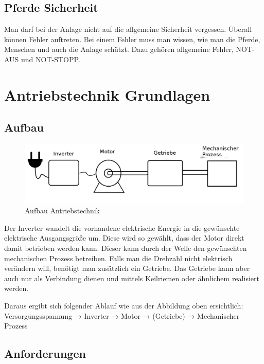 \documentclass[12pt]{scrreprt} %
\begin{document}
\subsection{Pferde Sicherheit}
\label{sec:pferdeSicherheit}

Man darf bei der Anlage nicht auf die allgemeine Sicherheit vergessen. Überall können Fehler auftreten. Bei einem Fehler muss man wissen, wie man die Pferde, Menschen und auch die Anlage schützt. Dazu gehören allgemeine Fehler, NOT-AUS und NOT-STOPP.
\newpage

\section{Antriebstechnik Grundlagen}
\label{sec:antriebstechnikGrundlagen}

\subsection{Aufbau}
\label{sec:aufbau}
\begin{figure}[!ht]
\begin{center}
	\caption{Aufbau Antriebstechnik}
	\includegraphics[width=1\textwidth]{AntriebstechnikAufbau}
\end{center}
\end{figure}

Der Inverter wandelt die vorhandene elektrische Energie in die gewünschte elektrische Ausgangsgröße um. 
Diese wird so gewählt, dass der Motor direkt damit betrieben werden kann. Dieser kann durch der Welle den gewünschten mechanischen Prozess betreiben.  Falls man die Drehzahl nicht elektrisch verändern will, benötigt man zusätzlich ein Getriebe. Das Getriebe kann aber auch nur als Verbindung dienen und mittels Keilriemen oder ähnlichem realisiert werden.

Daraus ergibt sich folgender Ablauf wie aus der Abbildung oben ersichtlich:
Versorgungsspannung → Inverter → Motor → (Getriebe) → Mechanischer Prozess

\subsection{Anforderungen}
\label{sec:anforderungen}
\end{document}
